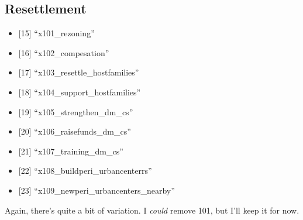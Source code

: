 \documentclass[12pt,]{article}
\providecommand{\tightlist}{%
\setlength{\itemsep}{0pt}\setlength{\parskip}{0pt}}
\begin{document}
\hypertarget{resettlement-1}{%
\subsection{Resettlement}\label{resettlement-1}}

\begin{itemize}
\tightlist
\item
  {[}15{]} ``x101\_rezoning''\\
\item
  {[}16{]} ``x102\_compesation''\\
\item
  {[}17{]} ``x103\_resettle\_hostfamilies''\\
\item
  {[}18{]} ``x104\_support\_hostfamilies''\\
\item
  {[}19{]} ``x105\_strengthen\_dm\_cs''\\
\item
  {[}20{]} ``x106\_raisefunds\_dm\_cs''\\
\item
  {[}21{]} ``x107\_training\_dm\_cs''\\
\item
  {[}22{]} ``x108\_buildperi\_urbancenterrs''\\
\item
  {[}23{]} ``x109\_newperi\_urbancenters\_nearby''
\end{itemize}

Again, there's quite a bit of variation. I \emph{could} remove 101, but
I'll keep it for now.
\end{document}
